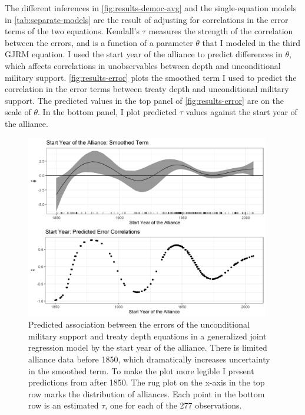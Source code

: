 \documentclass[12pt]{article}
\begin{document}
The different inferences in \autoref{fig:results-democ-avg} and the single-equation models in \autoref{tab:separate-models} are the result of adjusting for correlations in the error terms of the two equations. 
Kendall's $\tau$ measures the strength of the correlation between the errors, and is a function of a parameter $\theta$ that I modeled in the third GJRM equation.
I used the start year of the alliance to predict differences in $\theta$, which affects correlations in unobservables between depth and unconditional military support. 
\autoref{fig:results-error} plots the smoothed term I used to predict the correlation in the error terms between treaty depth and unconditional military support. 
The predicted values in the top panel of \autoref{fig:results-error} are on the scale of $\theta$. 
In the bottom panel, I plot predicted $\tau$ values against the start year of the alliance. 


\begin{figure}[hbtp]
\centering
\includegraphics[width=0.95\textwidth]{../figures/results-error.png}
\caption{Predicted association between the errors of the unconditional military support and treaty depth equations in a generalized joint regression model by the start year of the alliance. There is limited alliance data before 1850, which dramatically increases uncertainty in the smoothed term. To make the plot more legible I present predictions from after 1850. The rug plot on the x-axis in the top row marks the distribution of alliances. Each point in the bottom row is an estimated $\tau$, one for each of the 277 observations.}
\label{fig:results-error}
\end{figure}
\end{document}
